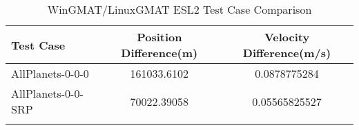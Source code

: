 \begin{table}[htbp!]
\centering
\caption{ WinGMAT/LinuxGMAT ESL2 Test Case Comparison}
      \begin{tabular}{lcc}
      \hline\hline
          Test Case & Position Difference(m) & Velocity Difference(m/s) \\
         \hline
         AllPlanets-0-0-0 & 161033.6102 & 0.0878775284 \\
         AllPlanets-0-0-SRP & 70022.39058 & 0.05565825527 \\
      \hline\hline
      \label{Table: ESL2 WinGMAT-LinuxGMAT Table} 
\end{tabular}
\end{table}
